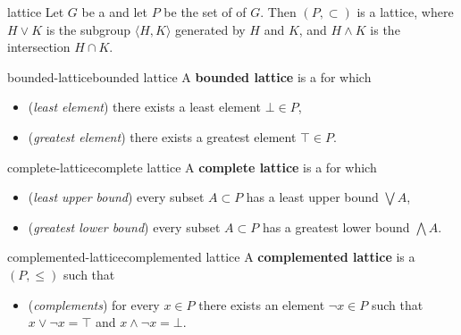 \begin{example}{lattice}
    Let $G$ be a  and let $P$ be the set of  of $G$. Then $(P, \subset)$ is a lattice, where $H \vee K$ is the subgroup $\langle H, K \rangle$ generated by $H$ and $K$, and $H \wedge K$ is the intersection $H \cap K$.
\end{example}

\begin{topic}{bounded-lattice}{bounded lattice}
    A \textbf{bounded lattice} is a  for which
    \begin{itemize}
        \item (\textit{least element}) there exists a least element $\bot \in P$,
        \item (\textit{greatest element}) there exists a greatest element $\top \in P$.
    \end{itemize}
\end{topic}

\begin{topic}{complete-lattice}{complete lattice}
    A \textbf{complete lattice} is a  for which
    \begin{itemize}
        \item (\textit{least upper bound}) every subset $A \subset P$ has a least upper bound $\bigvee A$,
        \item (\textit{greatest lower bound}) every subset $A \subset P$ has a greatest lower bound $\bigwedge A$.
    \end{itemize}
\end{topic}

\begin{topic}{complemented-lattice}{complemented lattice}
    A \textbf{complemented lattice} is a  $(P, \le)$ such that
    \begin{itemize}
        \item (\textit{complements}) for every $x \in P$ there exists an element $\neg x \in P$ such that $x \vee \neg x = \top$ and $x \wedge \neg x = \bot$.
    \end{itemize}
\end{topic}

